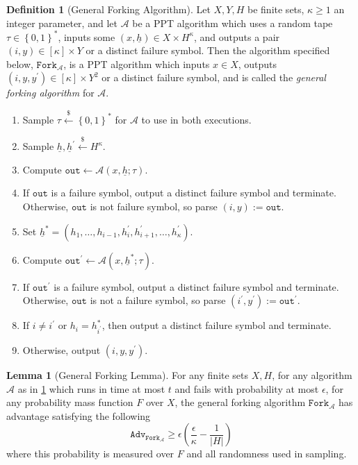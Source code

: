 \documentclass[11pt]{article}
\theoremstyle{definition}
\newtheorem{lemma}[lemma]{Lemma}
\newtheorem{definition}[definition]{Definition}
\newcommand{\bitstrings}{\left\{0,1\right\}^*}
\newcommand{\sample}{\overset{\$}{\leftarrow}}
\newcommand{\fork}{\texttt{Fork}}
\begin{document}
\begin{definition}[General Forking Algorithm]\label{def:general_forking_algorithm}
Let $X, Y, H$ be finite sets, $\kappa \geq 1$ an integer parameter, and let $\mathcal{A}$ be a PPT algorithm which uses a random tape $\tau \in \bitstrings$, inputs some $(x, \underline{h}) \in X \times H^\kappa$, and  outputs a pair $(i, y) \in [\kappa] \times Y$ or a distinct failure symbol. Then the algorithm specified below, $\fork_{\mathcal{A}}$, is a PPT algorithm which inputs $x \in X$, outputs $(i, y, y^\prime) \in [\kappa] \times Y^2$ or a distinct failure symbol, and is called the \textit{general forking algorithm} for $\mathcal{A}$.
\begin{enumerate}
\item Sample $\tau \sample \bitstrings$ for $\mathcal{A}$ to use in both executions.
\item Sample $\underline{h}, \underline{h}^\prime \sample H^\kappa$.
\item Compute $\texttt{out} \leftarrow \mathcal{A}(x, \underline{h}; \tau)$.
\item If $\texttt{out}$ is a failure symbol, output a distinct failure symbol and terminate. Otherwise, $\texttt{out}$ is not failure symbol, so parse $(i, y) := \texttt{out}$.
\item Set $\underline{h}^* = (h_1, \ldots, h_{i-1}, h^\prime_i, h^\prime_{i+1}, \ldots, h^\prime_\kappa)$.
\item Compute $\texttt{out}^\prime \leftarrow \mathcal{A}(x, \underline{h}^*; \tau)$.
\item If $\texttt{out}^\prime$ is a failure symbol, output a distinct failure symbol and terminate. Otherwise, $\texttt{out}$ is not a failure symbol, so parse $(i^\prime, y^\prime) := \texttt{out}^\prime$.
\item If $i \neq i^\prime$ or $h_i = h_{i^\prime}^*$, then output a distinct failure symbol and terminate.
\item Otherwise, output $(i, y, y^\prime)$.
\end{enumerate}
\end{definition}


\begin{lemma}[General Forking Lemma]\label{lem:general_forking_lemma}
For any finite sets $X, H$, for any algorithm $\mathcal{A}$ as in  \cref{def:general_forking_algorithm} which runs in time at most $t$ and fails with probability at most $\epsilon$, for any probability mass function $F$ over $X$, the general forking algorithm $\fork_\mathcal{A}$ has advantage satisfying the following
\[\texttt{Adv}_{\fork_\mathcal{A}} \geq \epsilon \left(\frac{\epsilon}{\kappa} - \frac{1}{\left|H\right|}\right)\] where this probability is measured over $F$ and all randomness used in sampling.
\end{lemma}
\end{document}
